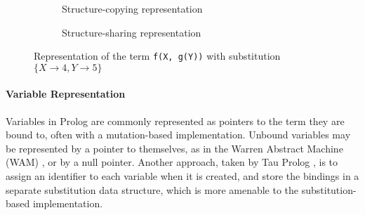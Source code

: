 \begin{figure}[H]
\centering
\begin{subfigure}{.5\textwidth}
\centering
{}
\caption{Structure-copying representation}
\end{subfigure}%
\begin{subfigure}{.5\textwidth}
\centering
{}
\caption{Structure-sharing representation}
\end{subfigure}
\caption{Representation of the term \texttt{f(X, g(Y))} with substitution $\{X \to 4, Y \to 5\}$}
\label{fig:term-representations}
\end{figure}

\paragraph{Variable Representation} Variables in Prolog are commonly represented as pointers to the term they are bound to, often with a mutation-based implementation. Unbound variables may be represented by a pointer to themselves, as in the Warren Abstract Machine (WAM) \cite{warrenAbstractPrologInstruction1983}, or by a null pointer. Another approach, taken by Tau Prolog \cite{riazaTauPrologProlog2024}, is to assign an identifier to each variable when it is created, and store the bindings in a separate substitution data structure, which is more amenable to the substitution-based implementation.

